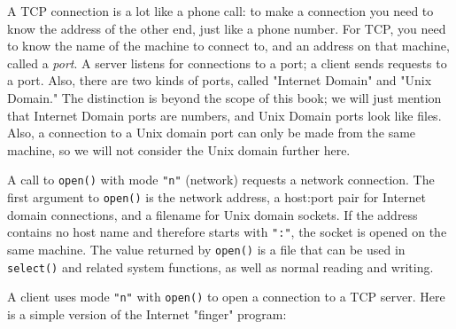 A TCP connection is a lot like a phone call: to make a connection you
need to know the address of the other end, just like a phone number.
For TCP, you need to know the name of the machine to connect to, and an
address on that machine, called a \textit{port}. A server listens for
connections to a port; a client sends requests to a port. Also, there
are two kinds of ports, called "Internet
Domain" and "Unix Domain."
The distinction is beyond the scope of this book; we will just mention
that Internet Domain ports are numbers, and Unix Domain ports look like
files. Also, a connection to a Unix domain port can only be made from
the same machine, so we will not consider the Unix domain further here.

A call to \texttt{open()} with mode
\texttt{"n"} (network) requests a network
connection. The first argument to \texttt{open()} is the network
address, a host:port pair for Internet domain connections, and a
filename for Unix domain sockets. If the address contains no host name
and therefore starts with \texttt{":"}, the
socket is opened on the same machine. The value returned by
\texttt{open()} is a file that can be used in \texttt{select()} and
related system functions, as well as normal reading and writing.

A client uses mode
\texttt{"n"} with \texttt{open()} to open a
connection to a TCP server. Here is a simple version of the Internet
"finger" program:


